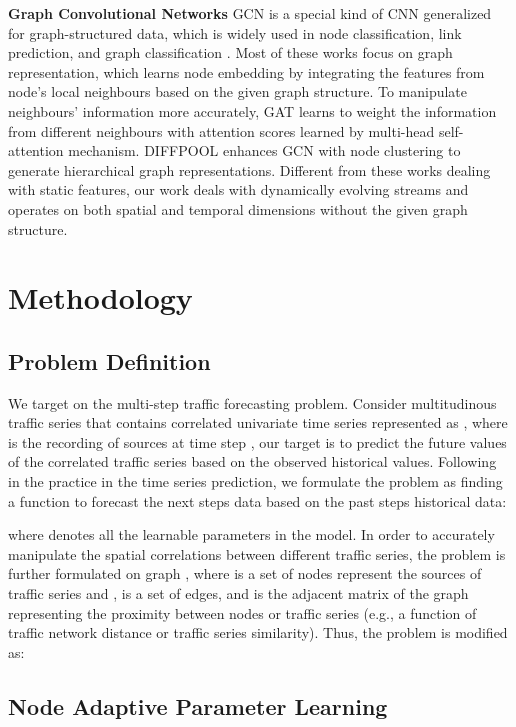 \documentclass{article}
\begin{document}
\textbf{Graph Convolutional Networks} GCN \cite{gcn-defferrard,kipf-gcn} is a special kind of CNN generalized for graph-structured data, which is widely used in node classification, link prediction, and graph classification \cite{wu2020gcnsurvey}. Most of these works focus on graph representation, which learns node embedding by integrating the features from node's local neighbours based on the given graph structure. To manipulate neighbours' information more accurately, GAT \cite{velivckovic2017gat} learns to weight the information from different neighbours with attention scores learned by multi-head self-attention mechanism. DIFFPOOL \cite{ying2018diffpool} enhances GCN with node clustering to generate hierarchical graph representations. Different from these works dealing with static features, our work deals with dynamically evolving streams and operates on both spatial and temporal dimensions without the given graph structure.


\section{Methodology}


\subsection{Problem Definition}
We target on the multi-step traffic forecasting problem. Consider  multitudinous traffic series that contains  correlated univariate time series represented as , where  is the recording of  sources at time step , our target is to predict the future values of the correlated traffic series based on the observed historical values.  Following in the practice in the time series prediction, we formulate the problem as finding a function  to forecast the next  steps data based on the past  steps historical data:

where  denotes all the learnable parameters in the model. In order to accurately manipulate the spatial correlations between different traffic series, the problem is  further formulated on graph , where  is a set of nodes represent the sources of traffic series and ,  is a set of edges, and  is the adjacent matrix of the graph representing the proximity between nodes or traffic series (e.g., a function of traffic network distance or traffic series similarity). Thus, the problem is modified as:


\subsection{Node Adaptive Parameter Learning}
\end{document}
